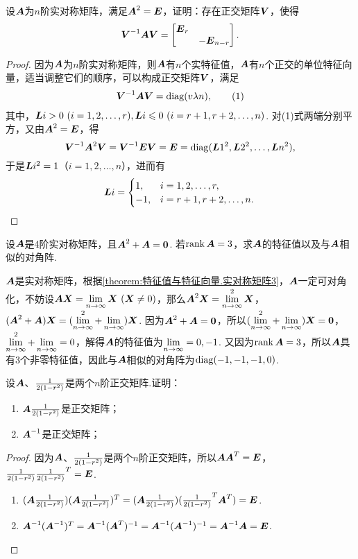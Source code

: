 \begin{example}
设\(\A\)为\(n\)阶实对称矩阵，满足\(\A^2=\E\)，证明：存在正交矩阵\(\Q\)，使得\[
\Q^{-1}\A\Q=\begin{bmatrix} \E_r \\ & -\E_{n-r} \end{bmatrix}.
\]
\begin{proof}
因为\(\A\)为\(n\)阶实对称矩阵，则\(\A\)有\(n\)个实特征值，\(\A\)有\(n\)个正交的单位特征向量，适当调整它们的顺序，可以构成正交矩阵\(\Q\)，满足\begin{gather}
\Q^{-1}\A\Q=\diag(\v{\lambda}{n}), \tag1
\end{gather}其中，\(\L{i}>0\ (i=1,2,\dotsc,r),%
\L{i}\leqslant0\ (i=r+1,r+2,\dotsc,n)\).
对(1)式两端分别平方，又由\(\A^2=\E\)，得\[
\Q^{-1}\A^2\Q
= \Q^{-1}\E\Q
= \E
= \diag(\L{1}^2,\L{2}^2,\dotsc,\L{n}^2),
\]于是\(\L{i}^2=1\)（\(i=1,2,\dotsc,n\)），进而有\[
\L{i}= \begin{cases}
1, & i=1,2,\dotsc,r, \\
-1, & i=r+1,r+2,\dotsc,n.
\end{cases}
\qedhere
\]
\end{proof}
\end{example}

\begin{example}
设\(\A\)是4阶实对称矩阵，且\(\A^2+\A=\z\).
若\(\rank\A=3\)，求\(\A\)的特征值以及与\(\A\)相似的对角阵.
\begin{solution}
\(\A\)是实对称矩阵，根据\cref{theorem:特征值与特征向量.实对称矩阵3}，\(\A\)一定可对角化，不妨设\(\A\x=\l\x\ (\x\neq0)\)，那么\(\A^2\x=\l^2\x\)，\((\A^2+\A)\x=(\l^2+\l)\x\).
因为\(\A^2+\A=\z\)，所以\((\l^2+\l)\x=\z\)，\(\l^2+\l=0\)，解得\(\A\)的特征值为\(\l=0,-1\).
又因为\(\rank\A=3\)，所以\(\A\)具有3个非零特征值，因此与\(\A\)相似的对角阵为\(\diag(-1,-1,-1,0)\).
\end{solution}
\end{example}

\begin{example}
设\(\A\)、\(\B\)是两个\(n\)阶正交矩阵.证明：
\begin{enumerate}
\item \(\A\B\)是正交矩阵；
\item \(\A^{-1}\)是正交矩阵；
\end{enumerate}
\begin{proof}
因为\(\A\)、\(\B\)是两个\(n\)阶正交矩阵，所以\(\A\A^T = \E\)，\(\B\B^T = \E\).
\begin{enumerate}
\item \((\A\B)(\A\B)^T
= (\A\B)(\B^T\A^T)
= \E\).
\item \(\A^{-1}(\A^{-1})^T
= \A^{-1} (\A^T)^{-1}
= \A^{-1} (\A^{-1})^{-1}
= \A^{-1} \A
= \E\).
\qedhere
\end{enumerate}
\end{proof}
\end{example}

